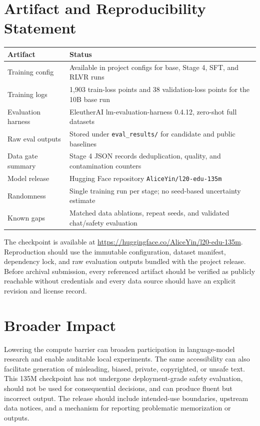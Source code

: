 \documentclass[11pt]{article}
\begin{document}
\section*{Artifact and Reproducibility Statement}

\begin{tabularx}{\linewidth}{lY}
\toprule
Artifact & Status \\
\midrule
Training config & Available in project configs for base, Stage 4, SFT, and RLVR runs \\
Training logs & 1,903 train-loss points and 38 validation-loss points for the 10B base run \\
Evaluation harness & EleutherAI lm-evaluation-harness 0.4.12, zero-shot full datasets \\
Raw eval outputs & Stored under \texttt{eval\_results/} for candidate and public baselines \\
Data gate summary & Stage 4 JSON records deduplication, quality, and contamination counters \\
Model release & Hugging Face repository \texttt{AliceYin/l20-edu-135m} \\
Randomness & Single training run per stage; no seed-based uncertainty estimate \\
Known gaps & Matched data ablations, repeat seeds, and validated chat/safety evaluation \\
\bottomrule
\end{tabularx}

The checkpoint is available at \url{https://huggingface.co/AliceYin/l20-edu-135m}. Reproduction should use the immutable configuration, dataset manifest, dependency lock, and raw evaluation outputs bundled with the project release. Before archival submission, every referenced artifact should be verified as publicly reachable without credentials and every data source should have an explicit revision and license record.

\section*{Broader Impact}

Lowering the compute barrier can broaden participation in language-model research and enable auditable local experiments. The same accessibility can also facilitate generation of misleading, biased, private, copyrighted, or unsafe text. This 135M checkpoint has not undergone deployment-grade safety evaluation, should not be used for consequential decisions, and can produce fluent but incorrect output. The release should include intended-use boundaries, upstream data notices, and a mechanism for reporting problematic memorization or outputs.



\end{document}
